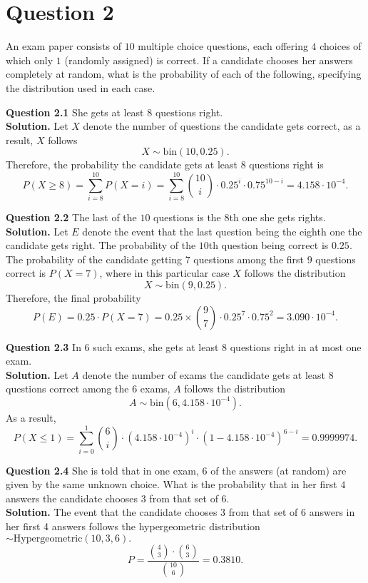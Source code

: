 \documentclass[
]{book}
\begin{document}
\section{Question 2}\label{question-2-2}

An exam paper consists of \(10\) multiple choice questions, each offering \(4\) choices of which only \(1\) (randomly assigned) is correct. If a candidate chooses her answers completely at random, what is the probability of each of the following, specifying the distribution used in each case.

\textbf{Question 2.1} She gets at least \(8\) questions right.\\
\textbf{Solution.} Let \(X\) denote the number of questions the candidate gets correct, as a result, \(X\) follows
\[X \sim \text{bin}(10,0.25).\]
Therefore, the probability the candidate gets at least \(8\) questions right is
\[P(X \geq 8) = \sum_{i = 8}^{10} P(X = i) = \sum_{i=8}^{10} \binom{10}{i} \cdot 0.25^{i} \cdot 0.75^{10-i} = 4.158 \cdot 10^{-4}.\]

\textbf{Question 2.2} The last of the \(10\) questions is the \(8\)th one she gets rights.\\
\textbf{Solution.} Let \(E\) denote the event that the last question being the eighth one the candidate gets right.
The probability of the \(10\)th question being correct is \(0.25\). The probability of the candidate getting \(7\) questions among the first \(9\) questions correct is \(P(X = 7)\), where in this particular case \(X\) follows the distribution \[X \sim \text{bin}(9, 0.25).\]
Therefore, the final probability
\[P(E) = 0.25 \cdot P(X = 7) = 0.25 \times \binom{9}{7} \cdot 0.25^7 \cdot 0.75^2 = 3.090 \cdot 10^{-4}.\]

\textbf{Question 2.3} In \(6\) such exams, she gets at least \(8\) questions right in at most one exam.\\
\textbf{Solution.} Let \(A\) denote the number of exams the candidate gets at least \(8\) questions correct among the \(6\) exams, \(A\) follows the distribution \[A \sim \text{bin}(6, 4.158 \cdot 10^{-4}).\] As a result, \[P(X \leq 1) = \sum_{i=0}^{1} \binom{6}{i} \cdot (4.158 \cdot 10^{-4})^i \cdot (1 - 4.158 \cdot 10^{-4})^{6-i} = 0.9999974.\]

\textbf{Question 2.4} She is told that in one exam, \(6\) of the answers (at random) are given by the same unknown choice. What is the probability that in her first \(4\) answers the candidate chooses \(3\) from that set of \(6\).\\
\textbf{Solution.} The event that the candidate chooses 3 from that set of \(6\) answers in her first 4 answers follows the hypergeometric distribution \(\sim \text{Hypergeometric}(10, 3, 6).\)
\[P = \frac{\binom{4}{3} \cdot \binom{6}{3}}{\binom{10}{6}} = 0.3810.\]
\end{document}
